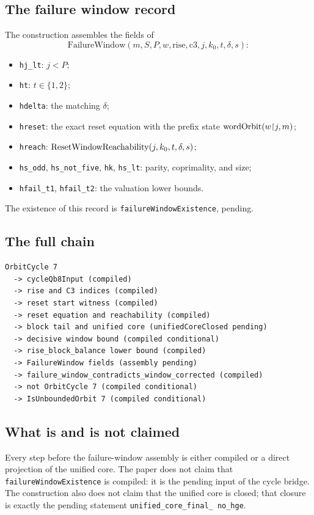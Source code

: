 \subsection{The failure window record}

The construction assembles the fields of
\begin{equation*}
  \mathrm{FailureWindow}(m,S,P,w,\mathrm{rise},\mathrm{c3},
  j,k_0,t,\delta,s):
\end{equation*}
\begin{itemize}[leftmargin=*]
\item \texttt{hj\_lt}: $j<P$;
\item \texttt{ht}: $t\in\{1,2\}$;
\item \texttt{hdelta}: the matching $\delta$;
\item \texttt{hreset}: the exact reset equation with the prefix state
  $\mathrm{wordOrbit}(w{\upharpoonright}j,m)$;
\item \texttt{hreach}: $\mathrm{ResetWindowReachability}(j,k_0,t,\delta,s)$;
\item \texttt{hs\_odd}, \texttt{hs\_not\_five}, \texttt{hk},
  \texttt{hs\_lt}: parity, coprimality, and size;
\item \texttt{hfail\_t1}, \texttt{hfail\_t2}: the valuation lower
  bounds.
\end{itemize}
The existence of this record is
\texttt{failureWindowExistence}, pending.

\subsection{The full chain}

\begin{verbatim}
OrbitCycle 7
  -> cycleQb8Input (compiled)
  -> rise and C3 indices (compiled)
  -> reset start witness (compiled)
  -> reset equation and reachability (compiled)
  -> block tail and unified core (unifiedCoreClosed pending)
  -> decisive window bound (compiled conditional)
  -> rise_block_balance lower bound (compiled)
  -> FailureWindow fields (assembly pending)
  -> failure_window_contradicts_window_corrected (compiled)
  -> not OrbitCycle 7 (compiled conditional)
  -> IsUnboundedOrbit 7 (compiled conditional)
\end{verbatim}

\subsection{What is and is not claimed}

Every step before the failure-window assembly is either compiled or a
direct projection of the unified core.  The paper does not claim that
\texttt{failureWindowExistence} is compiled: it is the pending input
of the cycle bridge.  The construction also does not claim that the
unified core is closed; that closure is exactly the pending statement
\texttt{unified\_\allowbreak core\_\allowbreak final\_\allowbreak
no\_\allowbreak hge}.

